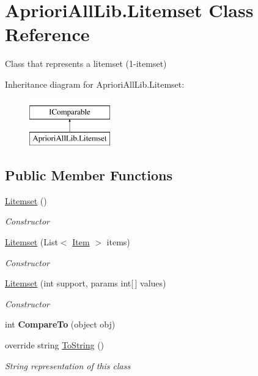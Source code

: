 \hypertarget{class_apriori_all_lib_1_1_litemset}{\section{Apriori\-All\-Lib.\-Litemset Class Reference}
\label{class_apriori_all_lib_1_1_litemset}
}


Class that represents a litemset (1-\/itemset)  


Inheritance diagram for Apriori\-All\-Lib.\-Litemset\-:\begin{figure}[H]
\begin{center}
\leavevmode
\includegraphics[height=2.000000cm]{class_apriori_all_lib_1_1_litemset}
\end{center}
\end{figure}
\subsection*{Public Member Functions}
\begin{DoxyCompactItemize}
\item 
\hyperlink{class_apriori_all_lib_1_1_litemset_af490087265e5b6389f19ce52775e6f35}{Litemset} ()
\begin{DoxyCompactList}\small\item\em Constructor \end{DoxyCompactList}\item 
\hyperlink{class_apriori_all_lib_1_1_litemset_a332a50f3e028dafcf393addcca5f3fb3}{Litemset} (List$<$ \hyperlink{class_apriori_all_lib_1_1_item}{Item} $>$ items)
\begin{DoxyCompactList}\small\item\em Constructor \end{DoxyCompactList}\item 
\hyperlink{class_apriori_all_lib_1_1_litemset_a2f9611a4cc391651629df60ea2e2f3e9}{Litemset} (int support, params int\mbox{[}$\,$\mbox{]} values)
\begin{DoxyCompactList}\small\item\em Constructor \end{DoxyCompactList}\item 
\hypertarget{class_apriori_all_lib_1_1_litemset_afcbe1c14c38d2638cb48ed9305de5a4e}{int {\bfseries Compare\-To} (object obj)}\label{class_apriori_all_lib_1_1_litemset_afcbe1c14c38d2638cb48ed9305de5a4e}

\item 
override string \hyperlink{class_apriori_all_lib_1_1_litemset_a512b70867120363edcd1178cec1c31f9}{To\-String} ()
\begin{DoxyCompactList}\small\item\em String representation of this class \end{DoxyCompactList}\end{DoxyCompactItemize}

